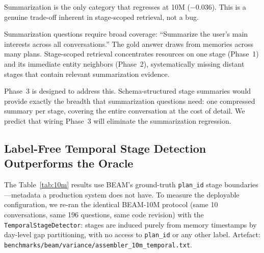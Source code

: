 \documentclass[11pt]{article}
\begin{document}
Summarization is the only category that regresses at 10M ($-0.036$).
This is a genuine trade-off inherent in stage-scoped retrieval, not a
bug.

Summarization questions require broad coverage: ``Summarize the
user's main interests across all conversations.''  The gold answer
draws from memories across many plans.  Stage-scoped retrieval
concentrates resources on one stage (Phase~1) and its immediate
entity neighbors (Phase~2), systematically missing distant stages
that contain relevant summarization evidence.

Phase~3 is designed to address this.  Schema-structured stage
summaries would provide exactly the breadth that summarization
questions need: one compressed summary per stage, covering the entire
conversation at the cost of detail.  We predict that wiring Phase~3
will eliminate the summarization regression.

\subsection{Label-Free Temporal Stage Detection Outperforms the Oracle}
\label{sec:temporal-stage-results}

The Table~\ref{tab:10m} results use BEAM's ground-truth
\texttt{plan\_id} stage boundaries---metadata a production system
does not have.  To measure the deployable configuration, we re-ran
the identical BEAM-10M protocol (same 10 conversations, same 196
questions, same code revision) with the
\texttt{TemporalStageDetector}: stages are induced purely from
memory timestamps by day-level gap partitioning, with no access to
\texttt{plan\_id} or any other label.  Artefact:
\texttt{benchmarks/beam/variance/assembler\_10m\_temporal.txt}.
\end{document}
